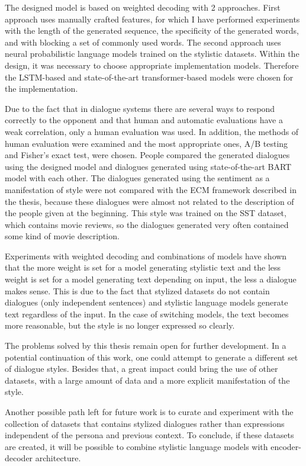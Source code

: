 The designed model is based on weighted decoding with 2 approaches. First approach uses manually crafted features, for which I have performed experiments with the length of the generated sequence, the specificity of the generated words, and with blocking a set of commonly used words. The second approach uses neural probabilistic language models trained on the stylistic datasets. Within the design, it was necessary to choose appropriate implementation models. Therefore the LSTM-based and state-of-the-art transformer-based models were chosen for the implementation.

Due to the fact that in dialogue systems there are several ways to respond correctly to the opponent and that human and automatic evaluations have a weak
correlation, only a human evaluation was used. In addition, the methods of human evaluation were examined and the most appropriate ones, A/B testing and Fisher's exact test, were chosen. People compared the generated dialogues using the designed model and dialogues generated using state-of-the-art BART model with each other. The dialogues generated using the sentiment as a manifestation of style were not compared with the ECM framework described in the thesis, because these dialogues were almost not related to the description of the people given at the beginning. This style was trained on the SST dataset, which contains movie reviews, so the dialogues generated very often contained some kind of movie description.

Experiments with weighted decoding and combinations of models have shown that the more weight is set for a model generating stylistic text and the less weight is set for a model generating text depending on input, the less a dialogue makes sense. This is due to the fact that stylized datasets do not contain dialogues (only independent sentences) and stylistic language models generate text regardless of the input. In the case of switching models, the text becomes more reasonable, but the style is no longer expressed so clearly.

The problems solved by this thesis remain open for further development. In a potential continuation of this work, one could attempt to generate a different set of dialogue styles. Besides that, a great impact could bring the use of other datasets, with a large amount of data and a more explicit manifestation of the style. 

Another possible path left for future work is to curate and experiment with the collection of datasets that contains stylized dialogues rather than expressions independent of the persona and previous context. To conclude, if these datasets are created, it will be possible to combine stylistic language models with encoder-decoder architecture.


